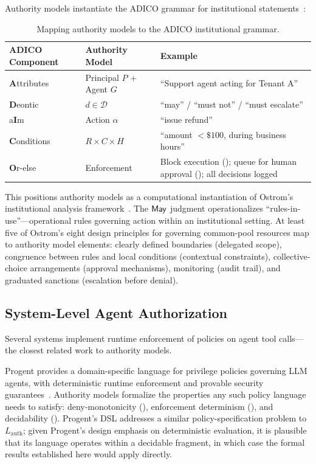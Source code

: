 \documentclass[11pt,a4paper]{article}
\newcommand{\termlabel}[1]{\ifmmode\mathsf{#1}\else{\normalfont\textsc{\MakeLowercase{#1}}}\fi}
\newcommand{\May}{\termlabel{May}}
\newcommand{\Deny}{\termlabel{Deny}}
\newcommand{\Escalate}{\termlabel{Escalate}}
\begin{document}
Authority models instantiate the ADICO grammar for institutional statements~\citep{crawford1995grammar}:

\begin{table}[!ht]
\centering
\caption{Mapping authority models to the ADICO institutional grammar.}
\label{tab:adico}
\small
\begin{tabularx}{\textwidth}{@{}l l X@{}}
\toprule
\textbf{ADICO Component} & \textbf{Authority Model} & \textbf{Example} \\
\midrule
\textbf{A}ttributes & Principal $P$ + Agent $G$ & ``Support agent acting for Tenant A'' \\
\textbf{D}eontic & $d \in \mathcal{D}$ & ``may'' / ``must not'' / ``must escalate'' \\
a\textbf{I}m & Action $\alpha$ & ``issue refund'' \\
\textbf{C}onditions & $R \times C \times H$ & ``amount $< \$100$, during business hours'' \\
\textbf{O}r-else & Enforcement & Block execution (\Deny); queue for human approval (\Escalate); all decisions logged \\
\bottomrule
\end{tabularx}
\end{table}

\noindent This positions authority models as a computational instantiation of Ostrom's institutional analysis framework~\citep{ostrom1990governing}. The $\May$ judgment operationalizes ``rules-in-use''---operational rules governing action within an institutional setting. At least five of Ostrom's eight design principles for governing common-pool resources map to authority model elements: clearly defined boundaries (delegated scope), congruence between rules and local conditions (contextual constraints), collective-choice arrangements (approval mechanisms), monitoring (audit trail), and graduated sanctions (escalation before denial).

\subsection{System-Level Agent Authorization}

Several systems implement runtime enforcement of policies on agent tool calls---the closest related work to authority models.

Progent provides a domain-specific language for privilege policies governing LLM agents, with deterministic runtime enforcement and provable security guarantees~\citep{shi2025progent}. Authority models formalize the properties any such policy language needs to satisfy: deny-monotonicity (), enforcement determinism (), and decidability (). Progent's DSL addresses a similar policy-specification problem to $L_{\mathrm{auth}}$; given Progent's design emphasis on deterministic evaluation, it is plausible that its language operates within a decidable fragment, in which case the formal results established here would apply directly.
\end{document}

